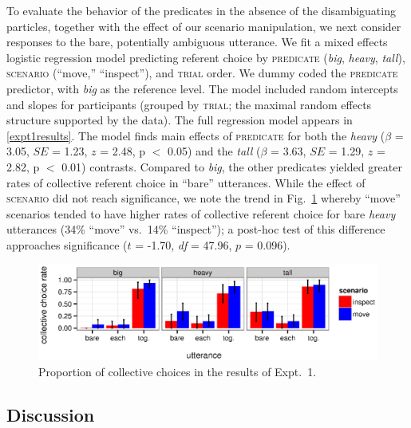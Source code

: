\documentclass[preprint,12pt,authoryear,titlepage]{elsarticle}
\begin{document}
To evaluate the behavior of the predicates in the absence of the disambiguating particles, together with the effect of our scenario manipulation, we next consider responses to the bare, potentially ambiguous utterance. We fit a mixed effects logistic regression model predicting referent choice by \textsc{predicate} (\emph{big}, \emph{heavy}, \emph{tall}), \textsc{scenario} (``move,'' ``inspect''), and \textsc{trial} order. We dummy coded the \textsc{predicate} predictor, with \emph{big} as the reference level. The model included random intercepts and slopes for participants (grouped by \textsc{trial}; the maximal random effects structure supported by the data). The full regression model appears in \ref{expt1results}. The model finds main effects of \textsc{predicate} for both the \emph{heavy} ($\beta$ = 3.05, $SE$ = 1.23, $z$ = 2.48, p $<$ 0.05) and the \emph{tall} ($\beta$ = 3.63, $SE$ = 1.29, $z$ = 2.82, p $<$ 0.01) contrasts. Compared to \emph{big}, the other predicates yielded greater rates of collective referent choice in ``bare'' utterances. While the effect of \textsc{scenario} did not reach significance, we note the trend in Fig.~\ref{results2} whereby ``move'' scenarios tended to have higher rates of collective referent choice for bare \emph{heavy} utterances (34\% ``move'' vs.~14\% ``inspect''); a post-hoc test of this difference approaches significance ($t$ = -1.70, \emph{df} = 47.96, $p$ = 0.096).


\begin{figure}[h]
	\centering
	\includegraphics[width=\linewidth]{plots/expt1bootsci.eps}
	\vspace{-20pt}
	\caption{Proportion of collective choices in the results of Expt.~1.}\label{results2}
\end{figure}


\subsection{Discussion}
\end{document}
